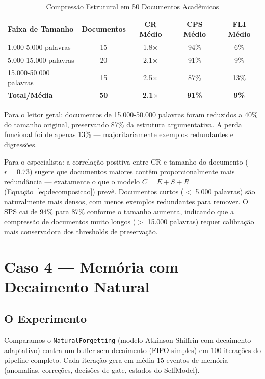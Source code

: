 \begin{table}[H]
\centering
\small
\caption{Compressão Estrutural em 50 Documentos Acadêmicos}
\label{tab:sce_scale}
\begin{tabular}{lcccc}
\toprule
\textbf{Faixa de Tamanho} & \textbf{Documentos} & \textbf{CR Médio} & \textbf{CPS Médio} & \textbf{FLI Médio} \\
\midrule
1.000-5.000 palavras & 15 & 1.8$\times$ & 94\% & 6\% \\
5.000-15.000 palavras & 20 & 2.1$\times$ & 91\% & 9\% \\
15.000-50.000 palavras & 15 & 2.5$\times$ & 87\% & 13\% \\
\midrule
\textbf{Total/Média} & \textbf{50} & \textbf{2.1$\times$} & \textbf{91\%} & \textbf{9\%} \\
\bottomrule
\end{tabular}
\end{table}

Para o leitor geral: documentos de 15.000-50.000 palavras foram reduzidos a 40\% do tamanho original, preservando 87\% da estrutura argumentativa. A perda funcional foi de apenas 13\% — majoritariamente exemplos redundantes e digressões.

Para o especialista: a correlação positiva entre CR e tamanho do documento ($r = 0.73$) sugere que documentos maiores contêm proporcionalmente mais redundância — exatamente o que o modelo $C = E + S + R$ (Equação~\ref{eq:decomposicao}) prevê. Documentos curtos ($<$ 5.000 palavras) são naturalmente mais densos, com menos exemplos redundantes para remover. O SPS cai de 94\% para 87\% conforme o tamanho aumenta, indicando que a compressão de documentos muito longos ($>$ 15.000 palavras) requer calibração mais conservadora dos thresholds de preservação.

\section{Caso 4 — Memória com Decaimento Natural}

\subsection{O Experimento}

Comparamos o \texttt{NaturalForgetting} (modelo Atkinson-Shiffrin com decaimento adaptativo) contra um buffer sem decaimento (FIFO simples) em 100 iterações do pipeline completo. Cada iteração gera em média 15 eventos de memória (anomalias, correções, decisões de gate, estados do SelfModel).

